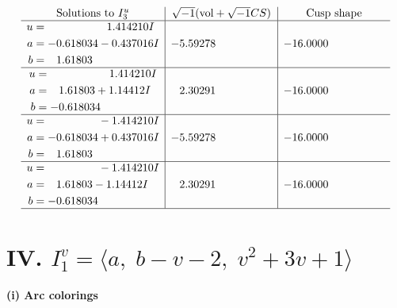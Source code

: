 \documentclass[1p]{elsarticle_modified}
\theoremstyle{definition}
\newcommand{\I}{\sqrt{-1}}
\begin{document}
$$\begin{array}{c|c|c}  
\text{Solutions to }I^u_{3}& \I (\text{vol} + \sqrt{-1}CS) & \text{Cusp shape}\\
 \hline 
\begin{aligned}
u &= \phantom{-0.000000 -}1.414210 I \\
a &= -0.618034 - 0.437016 I \\
b &= \phantom{-}1.61803\phantom{ +0.000000I}\end{aligned}
 & -5.59278\phantom{ +0.000000I} & -16.0000\phantom{ +0.000000I} \\ \hline\begin{aligned}
u &= \phantom{-0.000000 -}1.414210 I \\
a &= \phantom{-}1.61803 + 1.14412 I \\
b &= -0.618034\phantom{ +0.000000I}\end{aligned}
 & \phantom{-}2.30291\phantom{ +0.000000I} & -16.0000\phantom{ +0.000000I} \\ \hline\begin{aligned}
u &= \phantom{-0.000000 } -1.414210 I \\
a &= -0.618034 + 0.437016 I \\
b &= \phantom{-}1.61803\phantom{ +0.000000I}\end{aligned}
 & -5.59278\phantom{ +0.000000I} & -16.0000\phantom{ +0.000000I} \\ \hline\begin{aligned}
u &= \phantom{-0.000000 } -1.414210 I \\
a &= \phantom{-}1.61803 - 1.14412 I \\
b &= -0.618034\phantom{ +0.000000I}\end{aligned}
 & \phantom{-}2.30291\phantom{ +0.000000I} & -16.0000\phantom{ +0.000000I}\\
 \hline 
 \end{array}$$\newpage\newpage\renewcommand{\arraystretch}{1}
\centering \section*{IV. $I^v_{1}= \langle a,\;b- v-2,\;v^2+3 v+1 \rangle$}
\flushleft \textbf{(i) Arc colorings}\\
\end{document}
